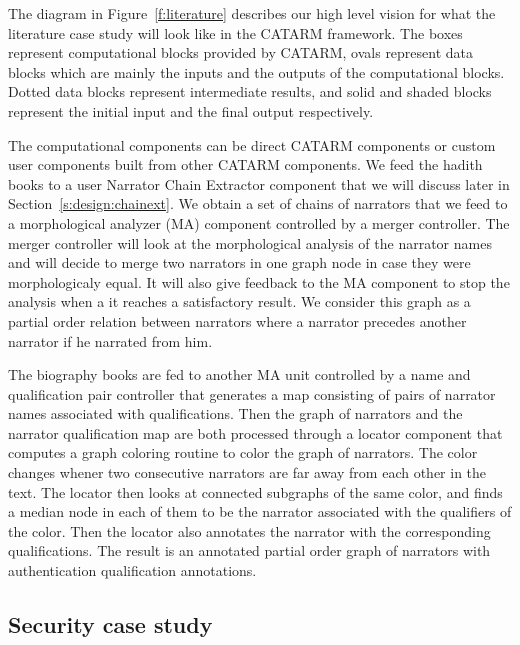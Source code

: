 \documentclass[12pt]{article}
\begin{document}
The diagram in Figure~\ref{f:literature} describes our 
high level vision for what the literature case study
will look like in the CATARM framework. 
The boxes represent 
computational blocks provided by CATARM, 
ovals represent data blocks which are mainly the 
inputs and the outputs of the computational blocks. 
Dotted data blocks represent intermediate results,
and solid and shaded blocks represent the initial input 
and the final output respectively. 

The computational components can be direct CATARM components
or custom user components built from other CATARM components.
We feed the hadith books to a user Narrator Chain Extractor
component that we will discuss later in 
Section~\ref{s:design:chainext}. We  obtain a set of chains
of narrators that we feed to a morphological analyzer (MA) 
component controlled by a merger controller. 
The merger controller will look at the morphological analysis
of the narrator names and will decide to merge two narrators in 
one graph node in case they were morphologicaly equal. 
It will also give feedback to the MA component to stop the
analysis when a it reaches a satisfactory result.
We consider this graph as a partial order relation between 
narrators where a narrator precedes another narrator if 
he narrated from him. 

The biography books are fed to another MA unit controlled by 
a name and qualification pair controller that generates a 
map consisting of pairs of narrator names associated with 
qualifications. 
Then the graph of narrators and the narrator qualification map
are both processed through a locator component that computes
a graph coloring routine to color the graph of narrators. 
The color changes whener two consecutive narrators are far away
from each other in the text. 
The locator then looks at connected subgraphs of the same color,
and finds a median node in each of them to be the narrator 
associated with the qualifiers of the color. 
Then the locator also annotates the narrator with the 
corresponding qualifications. 
The result is an annotated partial order graph of narrators
with authentication qualification annotations. 

\subsection{Security case study}
\label{s:design:sec}

\begin{figure}
\end{figure}
\end{document}
